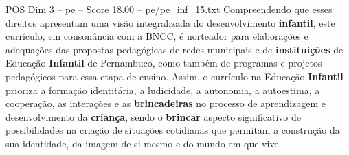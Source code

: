 \begin{textsample}{POS Dim 3 – pe – Score 18.00 – pe/pe\_inf\_15.txt}
Compreendendo que esses direitos apresentam uma visão integralizada do desenvolvimento \textbf{infantil}, este currículo, em consonância com a BNCC, é norteador para elaborações e adequações das propostas pedagógicas de redes municipais e de \textbf{instituições} de Educação \textbf{Infantil} de Pernambuco, como também de programas e projetos pedagógicos para essa etapa de ensino.
Assim, o currículo na Educação \textbf{Infantil} prioriza a formação identitária, a ludicidade, a autonomia, a autoestima, a cooperação, as interações e as \textbf{brincadeiras} no processo de aprendizagem e desenvolvimento da \textbf{criança}, sendo o \textbf{brincar} aspecto significativo de possibilidades na criação de situações cotidianas que permitam a construção da sua identidade, da imagem de si mesmo e do mundo em que vive.

\end{textsample}
